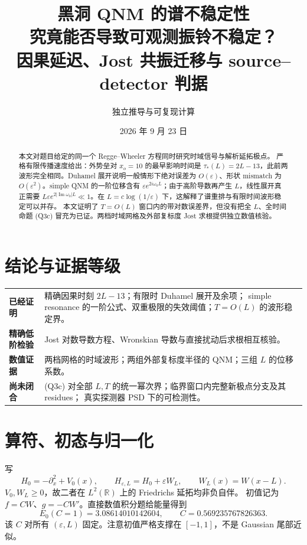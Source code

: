 \documentclass[UTF8,11pt,a4paper]{ctexart}
\title{\bfseries 黑洞 QNM 的谱不稳定性\\究竟能否导致可观测振铃不稳定？\\[4pt]
\large 因果延迟、Jost 共振迁移与 source--detector 判据}
\author{独立推导与可复现计算}
\date{2026 年 9 月 23 日}
\theoremstyle{definition}
\newcommand{\eps}{\varepsilon}
\newcommand{\om}{\omega}
\begin{document}
\maketitle

\begin{abstract}
本文对题目给定的同一个 Regge--Wheeler 方程同时研究时域信号与解析延拓极点。
严格有限传播速度给出：外势垒对 $x_o=10$ 的最早影响时间是
$\tau_*(L)=2L-13$，此前两波形完全相同。Duhamel 展开说明一般情形下绝对误差为
$O(\eps)$、形状 mismatch 为 $O(\eps^2)$。simple QNM 的一阶位移含有
$\eps e^{2i\om_0L}$；由于高阶导数再产生 $L$，线性展开真正需要
$L\eps e^{2|\operatorname{Im}\om_0|L}\ll1$。在
$L=c\log(1/\eps)$ 下，这解释了谱重排与有限时间波形稳定可以并存。
本文证明了 $T=O(L)$ 窗口内的带对数误差界，但没有把全 $L$、全时间命题 (Q3c)
冒充为已证。两档时域网格及外部复标度 Jost 求根提供独立数值核验。
\end{abstract}

\section*{结论与证据等级}
\begin{center}
\begin{tabularx}{\textwidth}{>{\bfseries}p{2.8cm}X}
\toprule
已经证明 & 精确因果时刻 $2L-13$；有限时 Duhamel 展开及余项；
simple resonance 的一阶公式、双重极限的失效阈值；$T=O(L)$ 的波形稳定界。\\
精确低阶检验 & Jost 对数导数方程、Wronskian 导数与直接扰动后求根相互核验。\\
数值证据 & 两档网格的时域波形；两组外部复标度半径的 QNM；三组 $L$ 的位移系数。\\
尚未闭合 & (Q3c) 对全部 $L,T$ 的统一幂次界；临界窗口内完整新极点分支及其 residues；
真实探测器 PSD 下的可检测性。\\
\bottomrule
\end{tabularx}
\end{center}

\section{算符、初态与归一化}

写
\[
H_0=-\partial_x^2+V_0(x),\qquad H_{\eps,L}=H_0+\eps W_L,
\qquad W_L(x)=W(x-L).
\]
$V_0,W_L\ge0$，故二者在 $L^2(\mathbb R)$ 上的 Friedrichs 延拓均非负自伴。
初值记为 $f=CW$、$g=-CW'$。直接数值积分题给能量得到
\begin{equation}
E_0(C=1)=3.08614010142604,\qquad C=0.569235767826363.      \tag{1}
\end{equation}
该 $C$ 对所有 $(\eps,L)$ 固定。注意初值严格支撑在 $[-1,1]$，不是 Gaussian 尾部近似。
\end{document}

